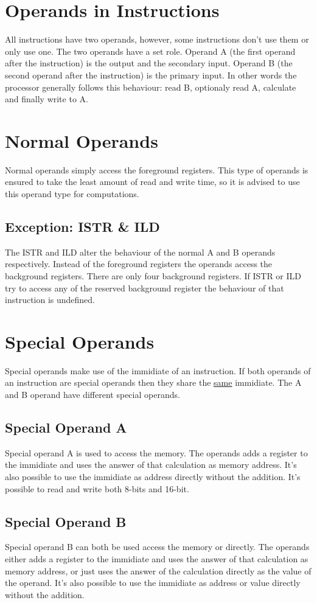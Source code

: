 \documentclass[oneside, a4paper]{memoir}
\begin{document}
\section{Operands in Instructions}
All instructions have two operands, however, some instructions don't use them or only use one. The two operands have a set role. Operand A (the first operand after the instruction) is the output and the secondary input. Operand B (the second operand after the instruction) is the primary input. In other words the processor generally follows this behaviour: read B, optionaly read A, calculate and finally write to A.
\section{Normal Operands}
Normal operands simply access the foreground registers. This type of operands is ensured to take the least amount of read and write time, so it is advised to use this operand type for computations.
\subsection{Exception: ISTR \& ILD}
The ISTR and ILD alter the behaviour of the normal A and B operands respectively. Instead of the foreground registers the operands access the background registers. There are only four background registers. If ISTR or ILD try to access any of the reserved background register the behaviour of that instruction is undefined.
\section{Special Operands}
Special operands make use of the immidiate of an instruction. If both operands of an instruction are special operands then they share the \underline{same} immidiate. The A and B operand have different special operands.
\subsection{Special Operand A}
Special operand A is used to access the memory. The operands adds a register to the immidiate and uses the answer of that calculation as memory address. It's also possible to use the immidiate as address directly without the addition. It's possible to read and write both 8-bits and 16-bit.
\subsection{Special Operand B}
Special operand B can both be used access the memory or directly. The operands either adds a register to the immidiate and uses the answer of that calculation as memory address, or just uses the answer of the calculation directly as the value of the operand. It's also possible to use the immidiate as address or value directly without the addition.
\end{document}
